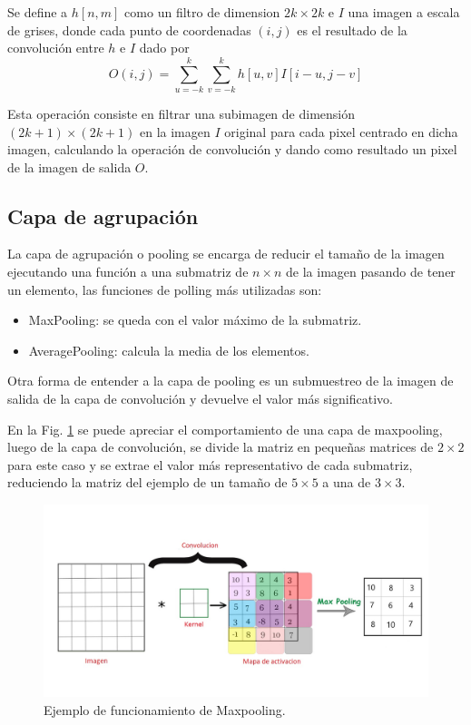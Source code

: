Se define a $h[n,m]$ como un filtro de dimension $2k \times 2k$ e $I$ una imagen a escala de grises, donde cada punto de coordenadas $(i,j)$ es el
resultado de la convolución entre $h$ e $I$ dado por
\begin{equation}
    O(i,j)= \sum_{u=-k}^{k} \sum_{v=-k}^{k} h[u,v]I[i-u,j-v]
\end{equation}

Esta operación consiste en filtrar una subimagen de dimensión $(2k+1)\times(2k+1)$ en la imagen $I$ original para cada pixel centrado en dicha imagen, calculando la operación de convolución y dando como resultado un pixel de la imagen de salida $O$.

\subsection{Capa de agrupación}

La capa de agrupación o pooling se encarga de reducir el tamaño de la imagen ejecutando una función a una submatriz de $n \times n$ de la imagen pasando de tener un elemento, las funciones de polling más utilizadas son:

\begin{itemize}
    \item MaxPooling: se queda con el valor máximo de la submatriz.
    \item AveragePooling: calcula la media de los elementos.
\end{itemize}

Otra forma de entender a la capa de pooling es un submuestreo de la imagen de salida de la capa de convolución y devuelve el valor más significativo.

En la Fig. \ref{fig:ejemplo-mp} se puede apreciar el comportamiento de una capa de maxpooling, luego de la capa de convolución, se divide la matriz
en pequeñas matrices de $2 \times 2$ para este caso y se extrae el valor más representativo de cada submatriz, reduciendo la matriz del ejemplo de un tamaño de
$5 \times 5$ a una de $3 \times 3$.
\begin{figure}
    \centering
    \includegraphics[width=1\textwidth]{imgs/ej-maxpooling.jpg}
    \caption{Ejemplo de funcionamiento de Maxpooling.}
    \label{fig:ejemplo-mp}
\end{figure}

